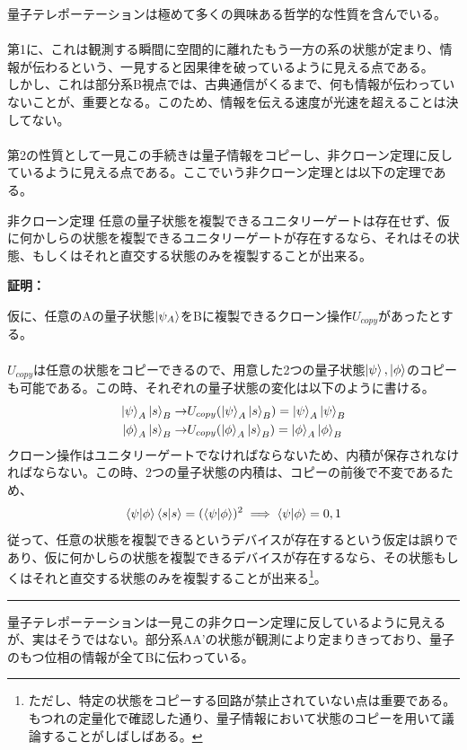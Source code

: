 \documentclass[a4paper,10.5pt]{article}
\numberwithin{equation}{section}
\newenvironment{proofbox}
{\begin{prooflabel}\textbf{証明：}\end{prooflabel}\vspace{0.8em}}
{\par\vspace{1em}\hrule\vspace{1em}}
\begin{document}
量子テレポーテーションは極めて多くの興味ある哲学的な性質を含んでいる。\\
\\
第1に、これは観測する瞬間に空間的に離れたもう一方の系の状態が定まり、情報が伝わるという、一見すると因果律を破っているように見える点である。\\
しかし、これは部分系B視点では、古典通信がくるまで、何も情報が伝わっていないことが、重要となる。このため、情報を伝える速度が光速を超えることは決してない。\\
\\
第2の性質として一見この手続きは量子情報をコピーし、非クローン定理に反しているように見える点である。ここでいう非クローン定理とは以下の定理である。
\begin{theorembox}{非クローン定理}
任意の量子状態を複製できるユニタリーゲートは存在せず、仮に何かしらの状態を複製できるユニタリーゲートが存在するなら、それはその状態、もしくはそれと直交する状態のみを複製することが出来る。
\end{theorembox}
\begin{proofbox}
仮に、任意のAの量子状態$\ket{\psi_{A}}$をBに複製できるクローン操作$U_{copy}$があったとする。\\
\\
$U_{copy}$は任意の状態をコピーできるので、用意した2つの量子状態$\ket{\psi},\ket{\phi}$のコピーも可能である。この時、それぞれの量子状態の変化は以下のように書ける。
 \begin{equation}\begin{split}
     \ket{\psi}_{A}\ket{s}_{B}\to&U_{copy}(\ket{\psi}_{A}\ket{s}_{B}) = \ket{\psi}_{A}\ket{\psi}_{B}\\
     \ket{\phi}_{A}\ket{s}_{B}\to&U_{copy}(\ket{\phi}_{A}\ket{s}_{B}) = \ket{\phi}_{A}\ket{\phi}_{B}\\
 \end{split} \end{equation}
クローン操作はユニタリーゲートでなければならないため、内積が保存されなければならない。この時、2つの量子状態の内積は、コピーの前後で不変であるため、
\begin{equation}\begin{split}
    \bra{\psi}\ket{\phi}\bra{s}\ket{s} = (\bra{\psi}\ket{\phi})^{2}\implies \bra{\psi}\ket{\phi}=0,1
\end{split} \end{equation}
従って、任意の状態を複製できるというデバイスが存在するという仮定は誤りであり、仮に何かしらの状態を複製できるデバイスが存在するなら、その状態もしくはそれと直交する状態のみを複製することが出来る\footnote{ただし、特定の状態をコピーする回路が禁止されていない点は重要である。もつれの定量化で確認した通り、量子情報において状態のコピーを用いて議論することがしばしばある。}。
\end{proofbox}
量子テレポーテーションは一見この非クローン定理に反しているように見えるが、実はそうではない。部分系AA'の状態が観測により定まりきっており、量子のもつ位相の情報が全てBに伝わっている。
\end{document}
